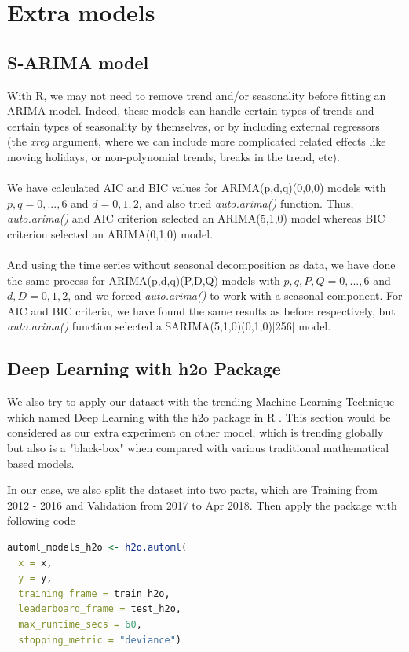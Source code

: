 \label{sec:06Extramodels}
\section{Extra models}

\subsection{S-ARIMA model}
With R, we may not need to remove trend and/or seasonality before fitting an ARIMA model. Indeed, these models can handle certain types of trends and certain types of seasonality by themselves, or by including external regressors (the \textit{xreg} argument, where we can include more complicated related effects like moving holidays, or non-polynomial trends, breaks in the trend, etc). 
\\
\\
We have calculated AIC and BIC values for ARIMA(p,d,q)(0,0,0) models with $p,q = 0,...,6$ and $d = 0,1,2$, and also tried \textit{auto.arima()} function. Thus, \textit{auto.arima()} and AIC criterion selected an ARIMA(5,1,0) model whereas BIC criterion selected an ARIMA(0,1,0) model.
\\
\\
And using the time series without seasonal decomposition as data, we have done the same process for ARIMA(p,d,q)(P,D,Q) models with $p,q,P,Q = 0,...,6$ and $d,D = 0,1,2$, and we forced \textit{auto.arima()} to work with a seasonal component. For AIC and BIC criteria, we have found the same results as before respectively, but \textit{auto.arima()} function selected a SARIMA(5,1,0)(0,1,0)[256] model.

\subsection{Deep Learning with h2o Package}
We also try to apply our dataset with the trending Machine Learning Technique - which named Deep Learning with the h2o package in R \cite{RH2ODeeplearning}. This section would be considered as our extra experiment on other model, which is trending globally but also is a "black-box" when compared with various traditional mathematical based models.

In our case, we also split the dataset into two parts, which are Training from 2012 - 2016 and Validation from 2017 to Apr 2018. Then apply the package with following code
\begin{lstlisting}[language=R]
automl_models_h2o <- h2o.automl(
  x = x, 
  y = y, 
  training_frame = train_h2o, 
  leaderboard_frame = test_h2o, 
  max_runtime_secs = 60, 
  stopping_metric = "deviance") 
 \end{lstlisting}
 
